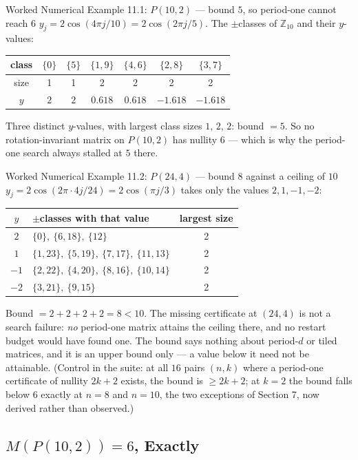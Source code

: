 \documentclass[11pt]{article}
\begin{document}
\begin{callbox}{Worked Numerical Example 11.1: $P(10,2)$ --- bound $5$, so period-one cannot reach $6$}
$y_j=2\cos(4\pi j/10)=2\cos(2\pi j/5)$. The $\pm$classes of $\mathbb Z_{10}$ and their $y$-values:
\begin{center}
\begin{tabular}{c|cccccc}
class & $\{0\}$ & $\{5\}$ & $\{1,9\}$ & $\{4,6\}$ & $\{2,8\}$ & $\{3,7\}$\\ \hline
size & 1 & 1 & 2 & 2 & 2 & 2\\
$y$ & $2$ & $2$ & $0.618$ & $0.618$ & $-1.618$ & $-1.618$
\end{tabular}
\end{center}
Three distinct $y$-values, with largest class sizes $1$, $2$, $2$: bound $=5$. So no rotation-invariant matrix on $P(10,2)$ has nullity $6$ --- which is why the period-one search always stalled at $5$ there.
\end{callbox}

\begin{callbox}{Worked Numerical Example 11.2: $P(24,4)$ --- bound $8$ against a ceiling of $10$}
$y_j=2\cos(2\pi\cdot4j/24)=2\cos(\pi j/3)$ takes only the values $2,1,-1,-2$:
\begin{center}
\begin{tabular}{c|l|c}
$y$ & $\pm$classes with that value & largest size\\ \hline
$2$ & $\{0\},\ \{6,18\},\ \{12\}$ & 2\\
$1$ & $\{1,23\},\ \{5,19\},\ \{7,17\},\ \{11,13\}$ & 2\\
$-1$ & $\{2,22\},\ \{4,20\},\ \{8,16\},\ \{10,14\}$ & 2\\
$-2$ & $\{3,21\},\ \{9,15\}$ & 2
\end{tabular}
\end{center}
Bound $=2+2+2+2=8<10$. The missing certificate at $(24,4)$ is not a search failure: \emph{no} period-one matrix attains the ceiling there, and no restart budget would have found one. The bound says nothing about period-$d$ or tiled matrices, and it is an upper bound only --- a value below it need not be attainable. (Control in the suite: at all $16$ pairs $(n,k)$ where a period-one certificate of nullity $2k+2$ exists, the bound is $\ge2k+2$; at $k=2$ the bound falls below $6$ exactly at $n=8$ and $n=10$, the two exceptions of Section 7, now derived rather than observed.)
\end{callbox}

\subsection{$M(P(10,2))=6$, Exactly}
\end{document}
